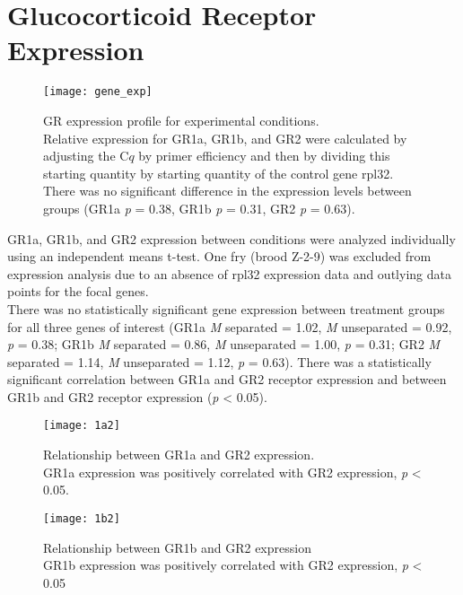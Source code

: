 \documentclass[12pt,twoside]{reedthesis}
\begin{document}
\section{Glucocorticoid Receptor Expression}

\begin{figure}[htbp] 
\begin{center} 
\texttt{[image: gene\_exp]}
\caption[GR expression profile for experimental
conditions]{\footnotesize{GR expression profile for experimental
      conditions.\\ Relative expression for GR1a, GR1b, and GR2 were calculated
  by adjusting the C$q$ by primer efficiency and then by dividing this starting
  quantity by starting quantity of the control gene rpl32. There was no
  significant difference in the expression levels between groups (GR1a
  \textit{p} = 0.38, GR1b \textit{p} = 0.31, GR2 \textit{p} = 0.63).}}
\label{subd}
\end{center} 
\end{figure}

 GR1a, GR1b, and GR2 expression between conditions were analyzed individually using an independent means
t-test. One fry (brood Z-2-9) was excluded from expression analysis due to an
absence of rpl32 expression data and outlying data points for the focal genes.\\
There was no statistically significant gene expression between treatment groups
for all three genes of interest (GR1a \textit{M} separated = 1.02, \textit{M}
unseparated = 0.92, \textit{p} = 0.38; GR1b \textit{M} separated = 0.86, \textit{M}
unseparated = 1.00, \textit{p} = 0.31; GR2 \textit{M} separated = 1.14, \textit{M}
unseparated = 1.12, \textit{p} = 0.63). There was a statistically significant
correlation between GR1a and GR2 receptor expression and between GR1b and GR2
receptor expression (\textit{p} < 0.05).

\begin{figure}[htbp] 
\begin{center} 
\texttt{[image: 1a2]}
\caption[Relationship between GR1a and GR2
expression]{\footnotesize{Relationship between GR1a and GR2 expression.\\ GR1a
    expression was positively correlated with GR2 expression, \textit{p} < 0.05.}}
\label{subd}
\end{center} 
\end{figure}

\begin{figure}[htbp] 
\begin{center} 
\texttt{[image: 1b2]}
\caption[Relationship between GR1b and GR2
expression]{\footnotesize{Relationship between GR1b and GR2 expression\\ GR1b
    expression was positively correlated with GR2 expression, \textit{p} < 0.05}}
\label{subd}
\end{center} 
\end{figure}
\end{document}
